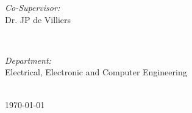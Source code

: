 \begin{titlepage}
\begin{minipage}{0.4\textwidth}
\begin{flushleft} \large
\emph{Co-Supervisor:}\\
Dr. JP de Villiers %
\end{flushleft}
\end{minipage}
~
\begin{minipage}{0.4\textwidth}
\begin{flushright} \large
\emph{Department:} \\
Electrical, Electronic and Computer Engineering
\end{flushright}
\end{minipage}\\ [2cm]


{\large \today}\\[3cm] %

\vfill %

\end{titlepage}
